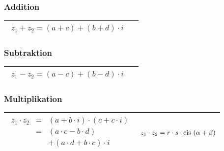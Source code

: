 \documentclass[a4paper]{article}
\begin{document}
\subsubsection{Addition}
\begin{tabular}{| p{} | p{} |}
\hline
\begin{eqnarray*}
z_1 + z_2 = (a + c) + (b+d) \cdot i
\end{eqnarray*} & \\
\hline
\end{tabular}

\subsubsection{Subtraktion}
\begin{tabular}{| p{} | p{} |}
\hline
\begin{eqnarray*}
z_1 - z_2 = (a - c) + (b-d) \cdot i
\end{eqnarray*} & \\
\hline
\end{tabular}


\subsubsection{Multiplikation}
\begin{tabular}{| p{} |  p{} |}
\hline
\begin{minipage}[t]{0.5\textwidth}
    \begin{eqnarray*}
    z_1 \cdot z_2 &=& (a + b \cdot i) \cdot (c + c \cdot i)\\
     &=& ( a \cdot c - b \cdot d) \\
     && + (a \cdot d + b \cdot c) \cdot i\\
    \end{eqnarray*}
\end{minipage}
&
\begin{minipage}[t]{0.5\textwidth}
    \begin{eqnarray*}
    z_1 \cdot z_2 = r \cdot s \cdot \text{cis }(\alpha + \beta)\\
    \end{eqnarray*}
\end{minipage}\\
\hline
\end{tabular}
\end{document}

